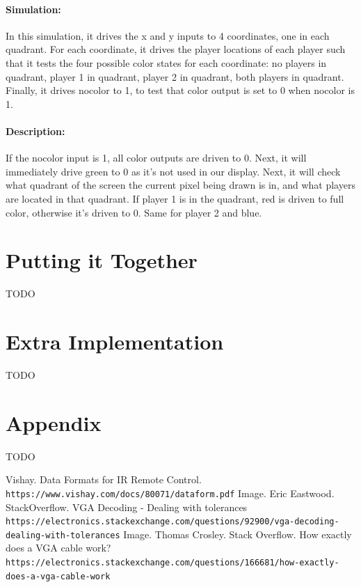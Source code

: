 \documentclass[]{article}
\begin{document}
\paragraph{Simulation:} In this simulation, it drives the x and y inputs to 4 coordinates, one in each quadrant.  For each coordinate, it drives the player locations of each player such that it tests the four possible color states for each coordinate: no players in quadrant, player 1 in quadrant, player 2 in quadrant, both players in quadrant.  Finally, it drives nocolor to 1, to test that color output is set to 0 when nocolor is 1.
\paragraph{Description:} If the nocolor input is 1, all color outputs are driven to 0.  Next, it will immediately drive green to 0 as it's not used in our display.  Next, it will check what quadrant of the screen the current pixel being drawn is in, and what players are located in that quadrant.  If player 1 is in the quadrant, red is driven to full color, otherwise it's driven to 0.  Same for player 2 and blue.

\section{Putting it Together}
TODO

\section{Extra Implementation}
TODO
\section{Appendix}
TODO

\begin{thebibliography}{99}
    Vishay. Data Formats for IR Remote Control. 
    \\\texttt{https://www.vishay.com/docs/80071/dataform.pdf}
    Image. Eric Eastwood. StackOverflow.  VGA Decoding - Dealing with tolerances
    \\\texttt{https://electronics.stackexchange.com/questions/92900/vga-decoding-dealing-with-tolerances}
    Image. Thomas Crosley. Stack Overflow.  How exactly does a VGA cable work?
    \\\texttt{https://electronics.stackexchange.com/questions/166681/how-exactly-does-a-vga-cable-work}
\end{thebibliography}
\end{document}
